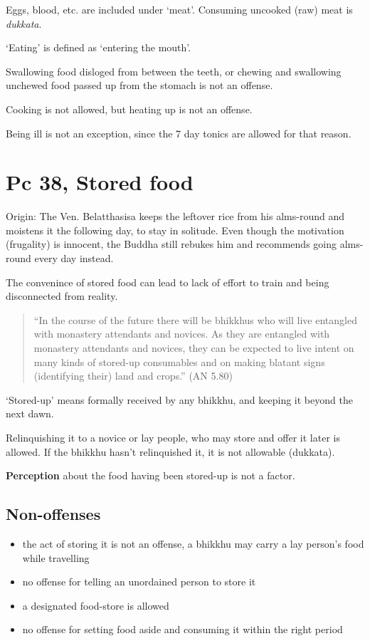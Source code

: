 Eggs, blood, etc. are included under `meat'. Consuming uncooked (raw)
meat is \emph{dukkata}.

`Eating' is defined as `entering the mouth'.

Swallowing food disloged from between the teeth, or chewing and
swallowing unchewed food passed up from the stomach is not an offense.

Cooking is not allowed, but heating up is not an offense.

Being ill is not an exception, since the 7 day tonics are allowed for
that reason.

\section{Pc 38, Stored food}

Origin: The Ven. Belatthasisa keeps the leftover rice from his
alms-round and moistens it the following day, to stay in solitude. Even
though the motivation (frugality) is innocent, the Buddha still rebukes
him and recommends going alms-round every day instead.

The convenince of stored food can lead to lack of effort to train and
being disconnected from reality.

\begin{quote}
``In the course of the future there will be bhikkhus who will live
entangled with monastery attendants and novices. As they are entangled
with monastery attendants and novices, they can be expected to live
intent on many kinds of stored-up consumables and on making blatant
signs (identifying their) land and crops.'' (AN 5.80)
\end{quote}

`Stored-up' means formally received by any bhikkhu, and keeping it
beyond the next dawn.

Relinquishing it to a novice or lay people, who may store and offer it
later is allowed. If the bhikkhu hasn't relinquished it, it is not
allowable (dukkata).

\textbf{Perception} about the food having been stored-up is not a
factor.

\clearpage

\subsection{Non-offenses}

\begin{itemize}
\tightlist
\item
  the act of storing it is not an offense, a bhikkhu may carry a lay
  person's food while travelling
\item
  no offense for telling an unordained person to store it
\item
  a designated food-store is allowed
\item
  no offense for setting food aside and consuming it within the right
  period
\end{itemize}

